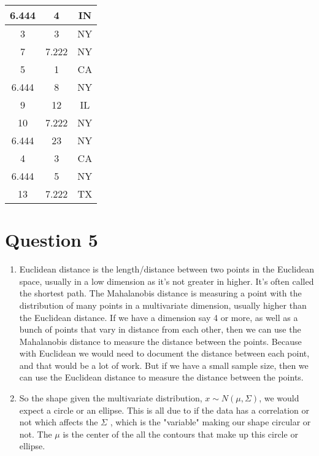 \documentclass{article}
\begin{document}
\begin{enumerate}[label=\alph*)]
\begin{table}[ht]
\begin{tabular}{|c|c|c|}
        6.444 & 4 & IN \\\hline
        3 & 3 & NY \\\hline
        7 & 7.222 &  NY \\\hline
        5 & 1 & CA \\\hline
        6.444 & 8 & NY \\\hline
        9 & 12 &  IL\\\hline
        10 & 7.222 &  NY\\\hline
        6.444 & 23 & NY \\\hline
        4 & 3 &  CA\\\hline
        6.444 & 5 &  NY\\\hline
        13 & 7.222 & TX \\\hline
        \end{tabular}
    \end{table}
\end{enumerate}
\section*{Question 5}
\begin{enumerate}[label=\alph*)]
    \item Euclidean distance is the length/distance between two points in the Euclidean space, usually in a low dimension as it's not greater in higher. 
    It's often called the shortest path. The Mahalanobis distance is measuring a point with the distribution of many points in a multivariate dimension, usually higher than the Euclidean distance. 
    If we have a dimension say 4 or more, as well as a bunch of points that vary in distance from each other, then we can use the Mahalanobis distance to measure the distance between the points. Because with Euclidean we would need to document
    the distance between each point, and that would be a lot of work. But if we have a small sample size, then we can use the Euclidean distance to measure the distance between the points.
    \item So the shape given the multivariate distribution, $x \sim N(\mu, \Sigma)$, we would expect a circle or an ellipse. This is all due to if the data has a correlation or not which affects the $\Sigma$
    , which is the "variable" making our shape circular or not. The $\mu$ is the center of the all the contours that make up this circle or ellipse.
\end{enumerate}
\end{document}
